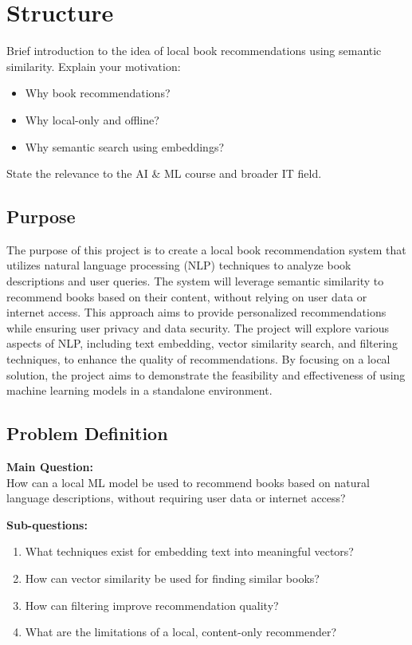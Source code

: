 \chapter{Structure}
\label{chapter:structure}
Brief introduction to the idea of local book recommendations using semantic similarity.
Explain your motivation:
\begin{itemize}
  \item Why book recommendations?
  \item Why local-only and offline?
  \item Why semantic search using embeddings?
\end{itemize}
State the relevance to the AI & ML course and broader IT field.

\section{Purpose}
\label{sec:purpose}
The purpose of this project is to create a local book recommendation system that utilizes natural language processing (NLP) techniques to analyze book descriptions and user queries. The system will leverage semantic similarity to recommend books based on their content, without relying on user data or internet access. This approach aims to provide personalized recommendations while ensuring user privacy and data security.
The project will explore various aspects of NLP, including text embedding, vector similarity search, and filtering techniques, to enhance the quality of recommendations. By focusing on a local solution, the project aims to demonstrate the feasibility and effectiveness of using machine learning models in a standalone environment.

\section{Problem Definition}
\textbf{Main Question:}\\
How can a local ML model be used to recommend books based on natural language descriptions, without requiring user data or internet access?

\textbf{Sub-questions:}
\begin{enumerate}
  \item What techniques exist for embedding text into meaningful vectors?
  \item How can vector similarity be used for finding similar books?
  \item How can filtering improve recommendation quality?
  \item What are the limitations of a local, content-only recommender?
\end{enumerate}

